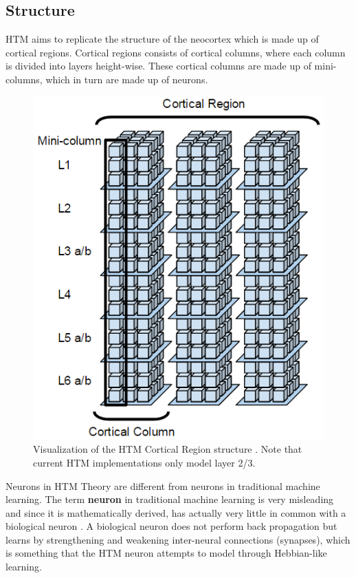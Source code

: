 \subsection{Structure}
HTM aims to replicate the structure of the neocortex which is made up of cortical regions. Cortical regions consists of cortical columns, where each column is divided into layers height-wise. These cortical columns are made up of mini-columns, which in turn are made up of neurons.
\begin{figure}[H]
    \centering
    \includegraphics[width=0.5\linewidth]{resources/related_works/cortical_region.png}
    \caption{Visualization of the HTM Cortical Region structure \cite{cortical_region}. Note that current HTM implementations only model layer 2/3.}
    \label{fig:cortical_region}
\end{figure}
Neurons in HTM Theory are different from neurons in traditional machine learning. The term \textbf{neuron} in traditional machine learning is very misleading and since it is mathematically derived, has actually very little in common with a biological neuron . A biological neuron does not perform back propagation but learns by strengthening and weakening inter-neural connections (synapses), which is something that the HTM neuron attempts to model through Hebbian-like learning.
